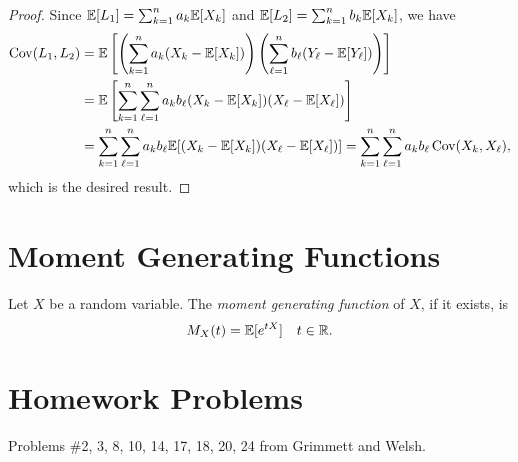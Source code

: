 \begin{proof}
  Since $\mathbb{E}[L_1] = \sum_{k = 1}^n a_k \mathbb{E}[X_k]$ and
  $\mathbb{E}[L_2] = \sum_{k = 1}^n b_k \mathbb{E}[X_k]$, we have
  \begin{align*}
    \operatorname{Cov}(L_1, L_2)
    &= \mathbb{E}\left[\left(\sum_{k = 1}^n a_k(X_k - \mathbb{E}[X_k]) \right)\left(\sum_{\ell = 1}^n b_\ell (Y_\ell - \mathbb{E}[Y_\ell])\right)\right] \\
    &= \mathbb{E}\left[\sum_{k = 1}^n \sum_{\ell = 1}^n a_k b_\ell (X_k - \mathbb{E}[X_k])(X_\ell - \mathbb{E}[X_\ell])\right] \\
    &= \sum_{k = 1}^n \sum_{\ell = 1}^n a_k b_\ell \mathbb{E}[(X_k - \mathbb{E}[X_k])(X_\ell - \mathbb{E}[X_\ell])]
    = \sum_{k = 1}^n \sum_{\ell = 1}^n a_k b_\ell \operatorname{Cov}(X_k, X_\ell),
  \end{align*}
  which is the desired result.
\end{proof}

\section{Moment Generating Functions}
\begin{definition}
  Let $X$ be a random variable. The
  \emph{moment generating function} of $X$, if it
  exists, is
  \[
    M_X(t) = \mathbb{E}[e^{tX}] \quad t \in \mathbb{R}.
  \]
\end{definition}

\section{Homework Problems}
Problems \#2, 3, 8, 10, 14, 17, 18, 20, 24
from Grimmett and Welsh.

